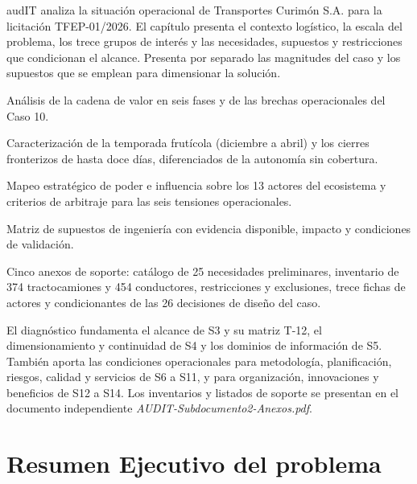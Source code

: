 
\begin{resumenApertura}
audIT analiza la situación operacional de Transportes Curimón S.A. para la licitación TFEP-01/2026. El capítulo presenta el contexto logístico, la escala del problema, los trece grupos de interés y las necesidades, supuestos y restricciones que condicionan el alcance. Presenta por separado las magnitudes del caso y los supuestos que se emplean para dimensionar la solución.

\begin{recibe}
  \item Análisis de la cadena de valor en seis fases y de las brechas operacionales del Caso 10.
  \item Caracterización de la temporada frutícola (diciembre a abril) y los cierres fronterizos de hasta doce días, diferenciados de la autonomía sin cobertura.
  \item Mapeo estratégico de poder e influencia sobre los 13 actores del ecosistema y criterios de arbitraje para las seis tensiones operacionales.
  \item Matriz de supuestos de ingeniería con evidencia disponible, impacto y condiciones de validación.
  \item Cinco anexos de soporte: catálogo de 25 necesidades preliminares, inventario de 374 tractocamiones y 454 conductores, restricciones y exclusiones, trece fichas de actores y condicionantes de las 26 decisiones de diseño del caso.
\end{recibe}
\end{resumenApertura}

El diagnóstico fundamenta el alcance de S3 y su matriz T-12, el dimensionamiento y continuidad de S4 y los dominios de información de S5. También aporta las condiciones operacionales para metodología, planificación, riesgos, calidad y servicios de S6 a S11, y para organización, innovaciones y beneficios de S12 a S14. Los inventarios y listados de soporte se presentan en el documento independiente \textit{AUDIT-Subdocumento2-Anexos.pdf}.

\section{Resumen Ejecutivo del problema}\label{sec:2-resumen-ejecutivo}

